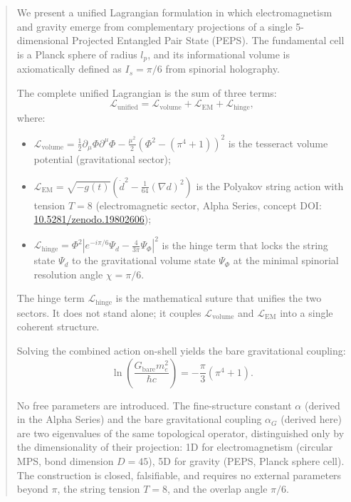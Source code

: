 \documentclass[12pt]{article}
\begin{document}
\begin{abstract}
We present a unified Lagrangian formulation in which electromagnetism and gravity emerge from complementary projections of a single 5-dimensional Projected Entangled Pair State (PEPS). The fundamental cell is a Planck sphere of radius \(l_p\), and its informational volume is axiomatically defined as \(I_s = \pi/6\) from spinorial holography.

The complete unified Lagrangian is the sum of three terms:
\[
\mathcal{L}_{\text{unified}} = \mathcal{L}_{\text{volume}} + \mathcal{L}_{\text{EM}} + \mathcal{L}_{\text{hinge}},
\]
where:
\begin{itemize}
    \item \(\mathcal{L}_{\text{volume}} = \frac{1}{2}\partial_\mu\Phi\partial^\mu\Phi - \frac{\mu^2}{2}(\Phi^2 - (\pi^4+1))^2\) is the tesseract volume potential (gravitational sector);
    \item \(\mathcal{L}_{\text{EM}} = \sqrt{-g(t)}\left( \dot{d}^2 - \frac{1}{64}(\nabla d)^2 \right)\) is the Polyakov string action with tension \(T=8\) (electromagnetic sector, Alpha Series, concept DOI: \href{https://doi.org/10.5281/zenodo.19802606}{10.5281/zenodo.19802606});
    \item \(\mathcal{L}_{\text{hinge}} = \Phi^2 \left| e^{-i\pi/6} \Psi_d - \frac{4}{3\pi} \Psi_{\Phi} \right|^2\) is the hinge term that locks the string state \(\Psi_d\) to the gravitational volume state \(\Psi_{\Phi}\) at the minimal spinorial resolution angle \(\chi = \pi/6\).
\end{itemize}

The hinge term \(\mathcal{L}_{\text{hinge}}\) is the mathematical suture that unifies the two sectors. It does not stand alone; it couples \(\mathcal{L}_{\text{volume}}\) and \(\mathcal{L}_{\text{EM}}\) into a single coherent structure.

Solving the combined action on-shell yields the bare gravitational coupling:
\[
\ln\left(\frac{G_{\text{bare}} m_e^2}{\hbar c}\right) = -\frac{\pi}{3}\left(\pi^4 + 1\right).
\]

No free parameters are introduced. The fine-structure constant \(\alpha\) (derived in the Alpha Series) and the bare gravitational coupling \(\alpha_G\) (derived here) are two eigenvalues of the same topological operator, distinguished only by the dimensionality of their projection: 1D for electromagnetism (circular MPS, bond dimension \(D=45\)), 5D for gravity (PEPS, Planck sphere cell). The construction is closed, falsifiable, and requires no external parameters beyond \(\pi\), the string tension \(T=8\), and the overlap angle \(\pi/6\).


\end{abstract}
\end{document}
